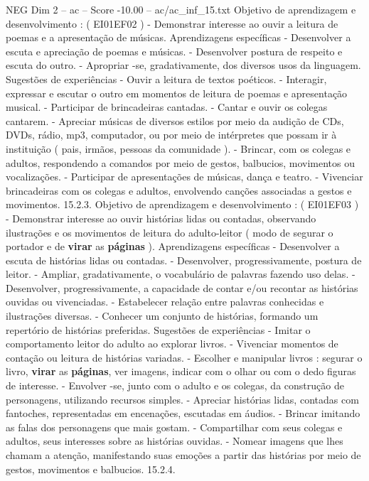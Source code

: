 \begin{textsample}{NEG Dim 2 – ac – Score -10.00 – ac/ac\_inf\_15.txt}
Objetivo de aprendizagem e desenvolvimento : ( EI01EF02 ) - Demonstrar interesse ao ouvir a leitura de poemas e a apresentação de músicas.
Aprendizagens específicas - Desenvolver a escuta e apreciação de poemas e músicas. - Desenvolver postura de respeito e escuta do outro. - Apropriar -se, gradativamente, dos diversos usos da linguagem.
Sugestões de experiências - Ouvir a leitura de textos poéticos. - Interagir, expressar e escutar o outro em momentos de leitura de poemas e apresentação musical. - Participar de brincadeiras cantadas. - Cantar e ouvir os colegas cantarem. - Apreciar músicas de diversos estilos por meio da audição de CDs, DVDs, rádio, mp3, computador, ou por meio de intérpretes que possam ir à instituição ( pais, irmãos, pessoas da comunidade ). - Brincar, com os colegas e adultos, respondendo a comandos por meio de gestos, balbucios, movimentos ou vocalizações. - Participar de apresentações de músicas, dança e teatro. - Vivenciar brincadeiras com os colegas e adultos, envolvendo canções associadas a gestos e movimentos. 15.2.3.
Objetivo de aprendizagem e desenvolvimento : ( EI01EF03 ) - Demonstrar interesse ao ouvir histórias lidas ou contadas, observando ilustrações e os movimentos de leitura do adulto-leitor ( modo de segurar o portador e de \textbf{virar} as \textbf{páginas} ).
Aprendizagens específicas - Desenvolver a escuta de histórias lidas ou contadas. - Desenvolver, progressivamente, postura de leitor. - Ampliar, gradativamente, o vocabulário de palavras fazendo uso delas. - Desenvolver, progressivamente, a capacidade de contar e/ou recontar as histórias ouvidas ou vivenciadas. - Estabelecer relação entre palavras conhecidas e ilustrações diversas. - Conhecer um conjunto de histórias, formando um repertório de histórias preferidas.
Sugestões de experiências - Imitar o comportamento leitor do adulto ao explorar livros. - Vivenciar momentos de contação ou leitura de histórias variadas. - Escolher e manipular livros : segurar o livro, \textbf{virar} as \textbf{páginas}, ver imagens, indicar com o olhar ou com o dedo figuras de interesse. - Envolver -se, junto com o adulto e os colegas, da construção de personagens, utilizando recursos simples. - Apreciar histórias lidas, contadas com fantoches, representadas em encenações, escutadas em áudios. - Brincar imitando as falas dos personagens que mais gostam. - Compartilhar com seus colegas e adultos, seus interesses sobre as histórias ouvidas. - Nomear imagens que lhes chamam a atenção, manifestando suas emoções a partir das histórias por meio de gestos, movimentos e balbucios. 15.2.4.

\end{textsample}

